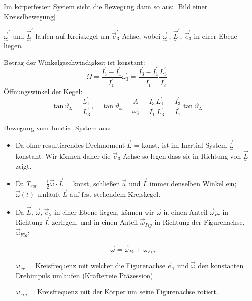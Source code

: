 \documentclass[10pt, letterpaper]{article}
\begin{document}
Im körperfesten System sieht die Bewegung dann so aus: [Bild einer Kreiselbewegung]

$\vec{\underset{\sim}{\omega}}^\prime$ und $\vec{\underset{\sim}{L}}^\prime$ laufen auf Kreiskegel um $\vec{e}_3^\prime$-Achse, wobei $\vec{\underset{\sim}{\omega}}^\prime$, $\vec{\underset{\sim}{L}}^\prime$, $\vec{e}_3^\prime$ in einer Ebene liegen.

Betrag der Winkelgeschwindigkeit ist konstant: 
$$\Omega = \frac{I_3^\prime-I_1^\prime}{I_1^\prime}\omega_3^\prime = \frac{I_3^\prime-I_1^\prime}{I_1^\prime}\frac{L_3^\prime}{I_3^\prime}$$
Öffnungswinkel der Kegel:
\[\tan\vartheta_L = \frac{L_\perp^\prime}{L_3^\prime}, \quad \tan\vartheta_\omega = \frac{A}{\omega_3^\prime} = \frac{I_3^\prime}{I_1^\prime}\frac{L_\perp^\prime}{L_3^\prime} = \frac{I_3^\prime}{I_1^\prime}\tan\vartheta_L\]


Bewegung vom Inertial-System aus:


\begin{itemize}
\item Da ohne resultierendes Drehmoment $\vec{L}$ = konst, ist im Inertial-System $\vec{\underset{\sim}{L}}$ konstant. Wir können daher die $\vec{e}_3$-Achse so legen dass sie in Richtung von $\vec{\underset{\sim}{L}}$ zeigt.

\item Da $T_{rot} = \frac{1}{2}\vec{\omega}\cdot\vec{L}$ = konst, schließen $\vec{\omega}$ und $\vec{L}$ immer denselben Winkel ein; $\vec{\omega}(t)$ umläuft $\vec{L}$ auf fest stehendem Kreiskegel.

\item Da $\vec{L}$, $\vec{\omega}$, $\vec{e}_3$ in einer Ebene liegen, können wir $\vec{\omega}$ in einen Anteil $\vec{\omega}_{Pr}$ in Richtung $\vec{L}$ zerlegen, und in einen Anteil $\vec{\omega}_{Fig}$ in Richtung der Figurenachse, $\vec{\omega}_{Fig}$:

\[\vec{\omega} = \vec{\omega}_{Pr} + \vec{\omega}_{Fig}\]

$\omega_{Pr}$ = Kreisfrequenz mit welcher die Figurenachse $\vec{e}_1$ und $\vec{\omega}$ den konstanten Drehimpuls umlaufen (Kräftefreie Präzession)

$\omega_{Fig}$ = Kreisfrequenz mit der Körper um seine Figurenachse rotiert.
\end{itemize}
\end{document}
